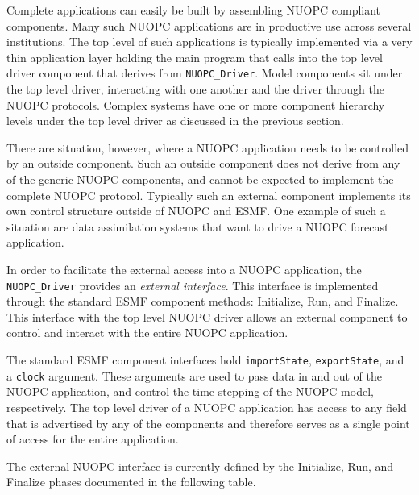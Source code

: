%

\label{ExternalInterface}

Complete applications can easily be built by assembling NUOPC compliant components. Many such NUOPC applications are in productive use across several institutions. The top level of such applications is typically implemented via a very thin application layer holding the main program that calls into the top level driver component that derives from {\tt NUOPC\_Driver}. Model components sit under the top level driver, interacting with one another and the driver through the NUOPC protocols. Complex systems have one or more component hierarchy levels under the top level driver as discussed in the previous section.

There are situation, however, where a NUOPC application needs to be controlled by an outside component. Such an outside component does not derive from any of the generic NUOPC components, and cannot be expected to implement the complete NUOPC protocol. Typically such an external component implements its own control structure outside of NUOPC and ESMF. One example of such a situation are data assimilation systems that want to drive a NUOPC forecast application. 

In order to facilitate the external access into a NUOPC application, the {\tt NUOPC\_Driver} provides an {\em external interface}. This interface is implemented through the standard ESMF component methods: Initialize, Run, and Finalize. This interface with the top level NUOPC driver allows an external component to control and interact with the entire NUOPC application.

The standard ESMF component interfaces hold {\tt importState}, {\tt exportState}, and a {\tt clock} argument. These arguments are used to pass data in and out of the NUOPC application, and control the time stepping of the NUOPC model, respectively. The top level driver of a NUOPC application has access to any field that is advertised by any of the components and therefore serves as a single point of access for the entire application.

The external NUOPC interface is currently defined by the Initialize, Run, and Finalize phases documented in the following table.

